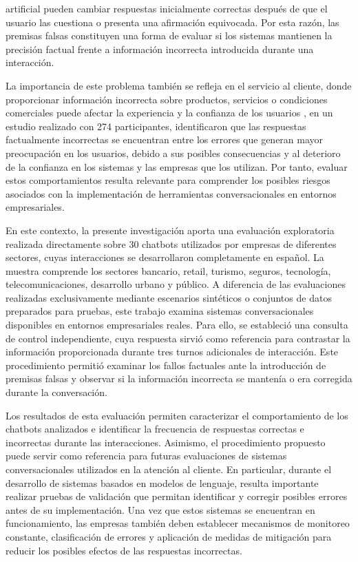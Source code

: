\documentclass[manuscrito,spanish]{rcc}
\begin{document}
artificial pueden cambiar respuestas inicialmente correctas después de que el usuario las cuestiona o presenta una afirmación equivocada. Por esta razón, las premisas falsas constituyen una forma de evaluar si los sistemas mantienen la precisión factual frente a información incorrecta introducida durante una interacción.

La importancia de este problema también se refleja en el servicio al cliente, donde proporcionar información incorrecta sobre productos, servicios o condiciones comerciales puede afectar la experiencia y la confianza de los usuarios \citet{larsen2025}, en un estudio realizado con 274 participantes, identificaron que las respuestas factualmente incorrectas se encuentran entre los errores que generan mayor preocupación en los usuarios, debido a sus posibles consecuencias y al deterioro de la confianza en los sistemas y las empresas que los utilizan. Por tanto, evaluar estos comportamientos resulta relevante para comprender los posibles riesgos asociados con la implementación de herramientas conversacionales en entornos empresariales.

En este contexto, la presente investigación aporta una evaluación exploratoria realizada directamente sobre 30 chatbots utilizados por empresas de diferentes sectores, cuyas interacciones se desarrollaron completamente en español. La muestra comprende los sectores bancario, retail, turismo, seguros, tecnología, telecomunicaciones, desarrollo urbano y público. A diferencia de las evaluaciones realizadas exclusivamente mediante escenarios sintéticos o conjuntos de datos preparados para pruebas, este trabajo examina sistemas conversacionales disponibles en entornos empresariales reales. Para ello, se estableció una consulta de control independiente, cuya respuesta sirvió como referencia para contrastar la información proporcionada durante tres turnos adicionales de interacción. Este procedimiento permitió examinar los fallos factuales ante la introducción de premisas falsas y observar si la información incorrecta se mantenía o era corregida durante la conversación.

Los resultados de esta evaluación permiten caracterizar el comportamiento de los chatbots analizados e identificar la frecuencia de respuestas correctas e incorrectas durante las interacciones. Asimismo, el procedimiento propuesto puede servir como referencia para futuras evaluaciones de sistemas conversacionales utilizados en la atención al cliente. En particular, durante el desarrollo de sistemas basados en modelos de lenguaje, resulta importante realizar pruebas de validación que permitan identificar y corregir posibles errores antes de su implementación. Una vez que estos sistemas se encuentran en funcionamiento, las empresas también deben establecer mecanismos de monitoreo constante, clasificación de errores y aplicación de medidas de mitigación para reducir los posibles efectos de las respuestas incorrectas.
\end{document}
